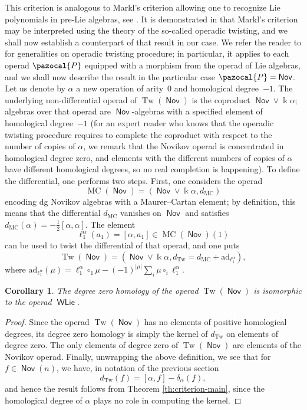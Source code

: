 \documentclass[11pt,reqno]{amsart}
\theoremstyle{plain}
\newtheorem{corollary}[theorem]{Corollary}
\theoremstyle{definition}
\theoremstyle{remark}
\newcommand{\bk}{\Bbbk}
\DeclareMathOperator{\Nov}{\mathsf{Nov}}
\DeclareMathOperator{\WLie}{\mathsf{WLie}}
\DeclareMathOperator{\MC}{MC}
\DeclareMathOperator{\Tw}{Tw}
\def\calP{\pazocal{P}}
\begin{document}
This criterion is analogous to Markl's criterion allowing one to recognize Lie polynomials in pre-Lie algebras, see \cite{MR2325698}. It is demonstrated in \cite{MR4709210} that Markl's criterion may be interpreted using the theory of the so-called operadic twisting, and we shall now establish a counterpart of that result in our case. We refer the reader to \cite{MR4621635} for generalities on operadic twisting procedure; in particular, it  applies to each operad $\calP$ equipped with a morphism from the operad of Lie algebras, and we shall now describe the result in the particular case $\calP=\Nov$. Let us denote by $\alpha$ a new operation of arity~$0$ and homological degree~$-1$. The underlying non-differential operad of $\Tw(\Nov)$ is the coproduct $\Nov\vee\bk\alpha$; algebras over that operad are $\Nov$-algebras with a specified element of homological degree~$-1$ (for an expert reader who knows that the operadic twisting procedure requires to complete the coproduct with respect to the number of copies of $\alpha$, we remark that the Novikov operad is concentrated in homological degree zero, and elements with the different numbers of copies of $\alpha$ have different homological degrees, so no real completion is happening). To define the differential, one performs two steps. First, one considers the operad
 \[
\MC(\Nov)=\left(\Nov\vee\bk\alpha, d_{\MC} \right)     
 \]
encoding dg Novikov algebras with a Maurer--Cartan element; by definition, this means that the differential $d_{\MC}$ vanishes on $\Nov$ and satisfies $d_{\MC}(\alpha)=-\frac12[\alpha,\alpha]$. The element 
 \[
\ell_1^{\alpha}(a_1)=[\alpha,a_1] \in \MC(\Nov)(1)   
 \]
can be used to twist the differential of that operad, and one puts 
 \[
\Tw(\Nov)=\left(\Nov\vee\bk\alpha, d_{\Tw}=d_{\MC}+\mathrm{ad}_{\ell_1^{\alpha}}\right), 
 \]
where $\mathrm{ad}_{\ell_1^{\alpha}}(\mu)=\ell_1^{\alpha}\circ_1\mu-(-1)^{|\mu|}\sum_i\mu\circ_i\ell_1^{\alpha}$. 

\begin{corollary}\label{cor:twisting-nov}
The degree zero homology of the operad $\Tw(\Nov)$ is isomorphic to the operad $\WLie$.
\end{corollary}

\begin{proof}
Since the operad $\Tw(\Nov)$ has no elements of positive homological degrees, its degree zero homology is simply the kernel of $d_{\Tw}$ on elements of degree zero. The only elements of degree zero of $\Tw(\Nov)$ are elements of the Novikov operad. Finally, unwrapping the above definition, we see that for $f\in\Nov(n)$, we have, in notation of the previous section
 \[
d_{\Tw}(f)= [\alpha,f]-\delta_\alpha(f),    
 \] 
and hence the result follows from Theorem \ref{th:criterion-main}, since the homological degree of $\alpha$ plays no role in computing the kernel.
\end{proof}
\end{document}
